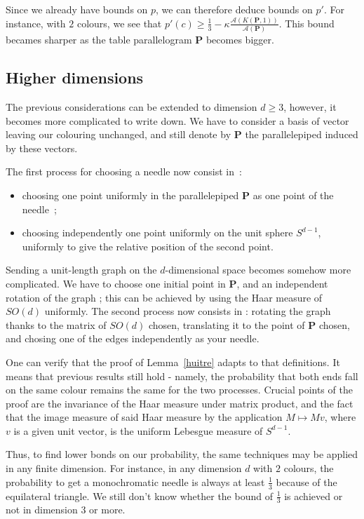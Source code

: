\documentclass[a4paper,11pt]{article}
\theoremstyle{definition}
\theoremstyle{remark}
\begin{document}
Since we already have bounds on $p$, we can therefore deduce bounds on $p'$.
For instance, with $2$ colours, we see that 
$p'(c) \geq \frac13 - \kappa \frac{\mathcal{A}(K(\mathbf{P},1))}{\mathcal{A}(\mathbf{P})}$. 
This bound becames sharper as the table parallelogram $\mathbf{P}$ becomes bigger.
\subsection{Higher dimensions}
\label{dim}
The previous considerations can be extended to dimension $d \geq 3$, however, 
it becomes more complicated to write down. We have to consider a basis of 
vector leaving our colouring unchanged, and still denote by $\mathbf{P}$ the 
parallelepiped induced by these vectors.

The first process for choosing a needle now consist in~: 
\begin{itemize}
	\item choosing one point uniformly in the parallelepiped $ \mathbf{P} $ as 
	one point of the needle~;
	\item choosing independently one point uniformly on the unit sphere 
	$S^{d-1}$, uniformly to give the relative position of the second point.
\end{itemize}

Sending a unit-length graph on the $d$-dimensional space becomes somehow more 
complicated. We have to choose one initial point in $ \mathbf{P} $, and an independent 
rotation of the graph ; this can be achieved 
by using the Haar measure of $SO(d)$ uniformly. The second process now consists 
in : rotating the graph thanks to the matrix of $SO(d)$ chosen, translating it 
to the point of $\mathbf{P}$ chosen, and chosing one of the 
edges independently as your needle.

One can verify that the proof of Lemma~\ref{huitre} adapts to that definitions. 
It means that previous results still hold - namely, the probability that both 
ends fall on the same colour remains the same for the two processes. Crucial 
points of the proof are the invariance of the Haar measure under matrix product, and the 
fact that the image measure of said Haar measure by the application 
$M\mapsto Mv$, where $v$ is a given unit vector, is the uniform Lebesgue 
measure of $S^{d-1}$.

Thus, to find lower bonds on our probability, the same techniques may be applied 
in any finite dimension. For instance, in any dimension $d$ with $2$ colours,
the probability to get a monochromatic  
needle is always at least $\frac{1}{3}$ because of the equilateral triangle. 
We still don't know whether the bound of $\frac{1}{3}$ is achieved or not in 
dimension $3$ or more. 
\end{document}
